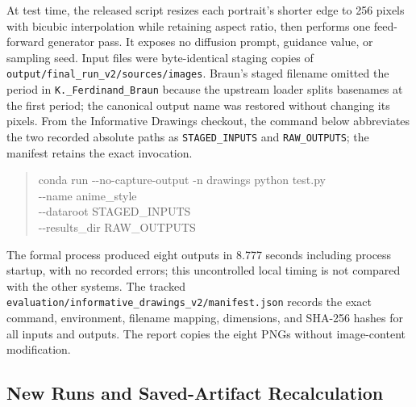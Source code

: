 At test time, the released script resizes each portrait's shorter edge to 256
pixels with bicubic interpolation while retaining aspect ratio, then performs
one feed-forward generator pass. It exposes no diffusion prompt, guidance
value, or sampling seed. Input files were byte-identical staging copies of
\nolinkurl{output/final_run_v2/sources/images}. Braun's staged filename omitted
the period in \nolinkurl{K._Ferdinand_Braun} because the upstream loader splits
basenames at the first period; the canonical output name was restored without
changing its pixels. From the Informative Drawings checkout, the command below
abbreviates the two recorded absolute paths as \nolinkurl{STAGED_INPUTS} and
\nolinkurl{RAW_OUTPUTS}; the manifest retains the exact invocation.

\begin{quote}\small\raggedright
conda run -{}-no-capture-output -n drawings python test.py \ShellContinue{}\\
\quad -{}-name anime\_style \ShellContinue{}\\
\quad -{}-dataroot STAGED\_INPUTS \ShellContinue{}\\
\quad -{}-results\_dir RAW\_OUTPUTS
\end{quote}

The formal process produced eight outputs in 8.777 seconds including process
startup, with no recorded errors; this uncontrolled local timing is not
compared with the other systems. The tracked
\nolinkurl{evaluation/informative_drawings_v2/manifest.json} records the exact
command, environment, filename mapping, dimensions, and SHA-256 hashes for all
inputs and outputs. The report copies the eight PNGs without image-content
modification.

\subsection{New Runs and Saved-Artifact Recalculation}

